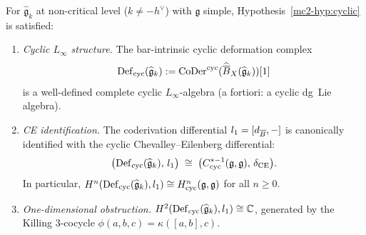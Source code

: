 \begin{theorem}\label{thm:mc2-1-km}
For $\widehat{\mathfrak{g}}_k$ at non-critical level ($k \neq -h^\vee$)
with $\mathfrak{g}$ simple, Hypothesis~\textup{\ref{mc2-hyp:cyclic}}
is satisfied:
\begin{enumerate}[label=\textup{(\roman*)}]
\item \emph{Cyclic $L_\infty$ structure.}
  The bar-intrinsic cyclic deformation complex
  \[
  \operatorname{Def}_{\mathrm{cyc}}(\widehat{\mathfrak{g}}_k)
  := \operatorname{CoDer}^{\mathrm{cyc}}(\widehat{\overline{B}}_X
  (\widehat{\mathfrak{g}}_k))[1]
  \]
  is a well-defined complete cyclic $L_\infty$-algebra
  \textup{(}a fortiori: a cyclic dg~Lie algebra\textup{)}.

\item \emph{CE identification.}
  The coderivation differential $l_1 = [d_{\overline{B}},-]$ is canonically
  identified with the cyclic Chevalley--Eilenberg differential:
  \begin{equation}\label{eq:coder-ce-ident}
  \bigl(\operatorname{Def}_{\mathrm{cyc}}(\widehat{\mathfrak{g}}_k),\, l_1\bigr)
  \;\cong\;
  \bigl(C^{*-1}_{\mathrm{cyc}}(\mathfrak{g},\mathfrak{g}),\,
  \delta_{\mathrm{CE}}\bigr).
  \end{equation}
  In particular,
  $H^n(\operatorname{Def}_{\mathrm{cyc}}(\widehat{\mathfrak{g}}_k), l_1) \cong
  H^n_{\mathrm{cyc}}(\mathfrak{g},\mathfrak{g})$
  for all $n \geq 0$.

\item \emph{One-dimensional obstruction.}
  $H^2(\operatorname{Def}_{\mathrm{cyc}}(\widehat{\mathfrak{g}}_k), l_1) \cong \mathbb{C}$,
  generated by the Killing $3$-cocycle
  $\phi(a,b,c) = \kappa([a,b],c)$.
\end{enumerate}
\end{theorem}

